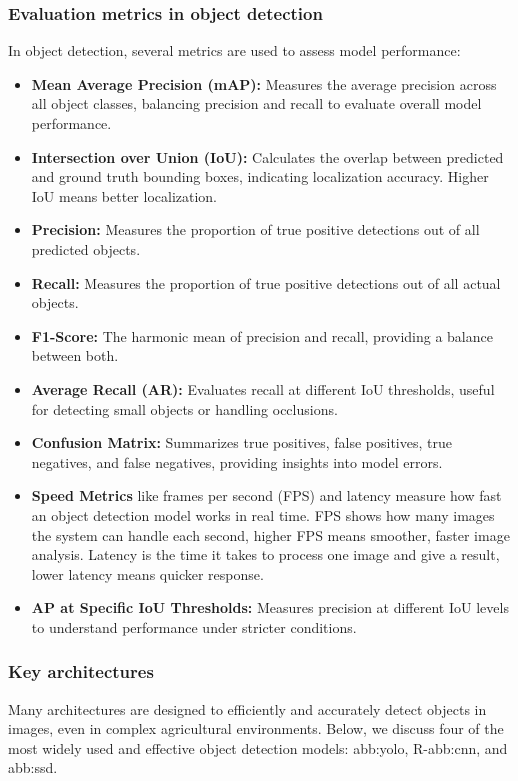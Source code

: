 \subsubsection{Evaluation metrics in object detection}    
In object detection, several metrics are used to assess model performance:
\begin{itemize}
    \item \textbf{Mean Average Precision (mAP):} Measures the average precision across all object classes, balancing precision and recall to evaluate overall model performance.
    \item \textbf{Intersection over Union (IoU):} Calculates the overlap between predicted and ground truth bounding boxes, indicating localization accuracy. Higher IoU means better localization.
    
    \item \textbf{Precision:} Measures the proportion of true positive detections out of all predicted objects.
    \item \textbf{Recall:} Measures the proportion of true positive detections out of all actual objects.
   
    \item \textbf{F1-Score:} The harmonic mean of precision and recall, providing a balance between both.
    \item \textbf{Average Recall (AR):} Evaluates recall at different IoU thresholds, useful for detecting small objects or handling occlusions.
    \item \textbf{Confusion Matrix:} Summarizes true positives, false positives, true negatives, and false negatives, providing insights into model errors.
    \item \textbf{Speed Metrics} like frames per second (FPS) and latency measure how fast an object detection model works in real time. FPS shows how many images the system can handle each second, higher FPS means smoother, faster image analysis. Latency is the time it takes to process one image and give a result, lower latency means quicker response.
    \item \textbf{AP at Specific IoU Thresholds:} Measures precision at different IoU levels to understand performance under stricter conditions.
\end{itemize}

\subsubsection{Key architectures}
Many architectures are designed to efficiently and accurately detect objects in images, even in complex agricultural environments. Below, we discuss four of the most widely used and effective object detection models: \gls{abb:yolo}, R-\gls{abb:cnn}, and \gls{abb:ssd}. 

